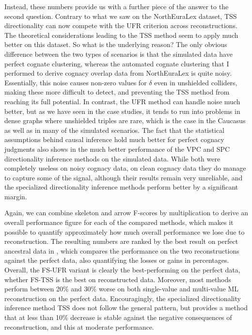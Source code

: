 Instead, these numbers provide us with a further piece of the answer to the second question. Contrary to what we saw on the NorthEuraLex dataset, TSS directionality can now compete with the UFR criterion across reconstructions. The theoretical considerations leading to the TSS method seem to apply much better on this dataset. So what is the underlying reason? The only obvious difference between the two types of scenarios is that the simulated data have perfect cognate clustering, whereas the automated cognate clustering that I performed to derive cognacy overlap data from NorthEuraLex is quite noisy. Essentially, this noise causes non-zero values for $\delta$ even in unshielded colliders, making these more difficult to detect, and preventing the TSS method from reaching its full potential. In contrast, the UFR method can handle noise much better, but as we have seen in the case studies, it tends to run into problems in dense graphs where unshielded triples are rare, which is the case in the Caucasus as well as in many of the simulated scenarios. The fact that the statistical assumptions behind causal inference hold much better for perfect cognacy judgments also shows in the much better performance of the VPC and SPC directionality inference methods on the simulated data. While both were completely useless on noisy cognacy data, on clean cognacy data they do manage to capture some of the signal, although their results remain very unreliable, and the specialized directionality inference methods perform better by a significant margin.

Again, we can combine skeleton and arrow F-scores by multiplication to derive an overall performance figure for each of the compared methods, which makes it possible to quantify approximately how much overall performance we lose due to reconstruction. The resulting numbers are ranked by the best result on perfect ancestral data in , which compares the performance on the two reconstructions against the perfect data, also quantifying the losses or gains in percentages. Overall, the FS-UFR variant is clearly the best-performing on the perfect data, whether FS-TSS is the best on reconstructed data. Moreover, most methods perform between 20\% and 30\% worse on both single-value and multi-value ML reconstruction on the perfect data. Encouragingly, the specialized directionality inference method TSS does not follow the general pattern, but provides a method that at less than 10\% decrease is stable against the negative consequences of reconstruction, and this 
at moderate performance.


